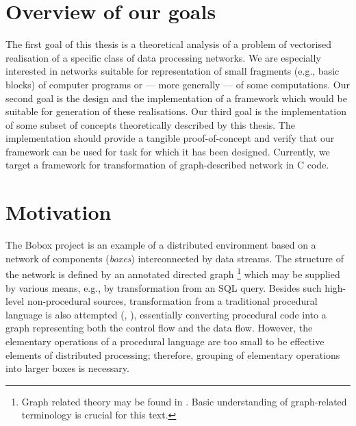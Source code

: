 
\section{Overview of our goals}


The first goal of this thesis is a theoretical analysis of a problem of vectorised realisation of a specific class of data processing networks. We are especially interested in networks suitable for representation of small fragments (e.g., basic blocks) of computer programs or --- more generally --- of some computations. Our second goal is the design and the implementation of a framework which would be suitable for generation of these realisations.  Our third goal is the implementation of some subset of concepts theoretically described by this thesis. The implementation should provide a tangible proof-of-concept and verify that our framework can be used for task for which it has been designed. Currently, we target a framework for transformation of graph-described network in C code.

\section{Motivation}

The Bobox project \cite{bobox} is an example of a distributed environment based on a network of components (\emph{boxes}) interconnected by data streams. The structure of the network is defined by an annotated directed graph \footnote{Graph related theory may be found in \cite{chapters}. Basic understanding of graph-related terminology is crucial for this text.} which may be supplied by various means, e.g., by transformation from an SQL query. Besides such high-level non-procedural sources, transformation from a traditional procedural language is also attempted (\cite{dbnetworks}, \cite{hfg}), essentially converting procedural code into a graph representing both the control flow and the data flow. However, the elementary operations of a procedural language are too small to be effective elements of distributed processing; therefore, grouping of elementary operations into larger boxes is necessary.

